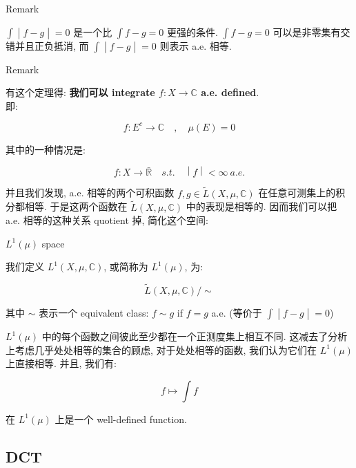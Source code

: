 \documentclass{qlnotes-export}
\begin{document}
\begin{qlremark}{Remark}

\(\left. \int \middle| f - g \middle| = 0 \right.\) 是一个比 \(\int f - g = 0\) 更强的条件. \(\int f - g = 0\) 可以是非零集有交错并且正负抵消, 而 \(\left. \int \middle| f - g \middle| = 0 \right.\) 则表示 a.e. 相等.

\end{qlremark}

\begin{qlremark}{Remark}

有这个定理得: \textbf{我们可以 integrate \(f:X\rightarrow{\mathbb{C}}\) a.e. defined}.\\
即:

\[f:E^{c}\rightarrow{\mathbb{C}}\quad,\quad\mu(E) = 0\]

其中的一种情况是:

\[\left. f:X\rightarrow\bar{\mathbb{R}}\quad s.t.\quad \middle| f \middle| < \infty\ a.e. \right.\]

\end{qlremark}

并且我们发现, a.e. 相等的两个可积函数 \(f,g \in \widetilde{L}(X,\mu,{\mathbb{C}})\) 在任意可测集上的积分都相等. 于是这两个函数在 \(\widetilde{L}(X,\mu,{\mathbb{C}})\) 中的表现是相等的. 因而我们可以把 a.e. 相等的这种关系 quotient 掉, 简化这个空间:

\begin{definition}{\(L^{1}(\mu)\) space}\label{def-05-integration-of-real-and-complex-functions-l-1-mu-space}

我们定义 \(L^{1}(X,\mu,{\mathbb{C}})\), 或简称为 \(L^{1}(\mu)\), 为:

\[\widetilde{L}(X,\mu,{\mathbb{C}})/ \sim\]

其中 \(\sim\) 表示一个 equivalent class: \(f \sim g\) if \(f = g\) a.e. (等价于 \(\left. \int \middle| f - g \middle| = 0 \right.\))

\end{definition}

\(L^{1}(\mu)\) 中的每个函数之间彼此至少都在一个正测度集上相互不同. 这减去了分析上考虑几乎处处相等的集合的顾虑, 对于处处相等的函数, 我们认为它们在 \(L^{1}(\mu)\) 上直接相等. 并且, 我们有:

\[f\mapsto\int f\]

在 \(L^{1}(\mu)\) 上是一个 well-defined function.

\subsection{DCT}\label{dct}
\end{document}
